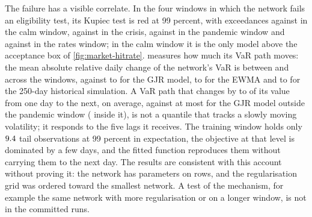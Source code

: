 The failure has a visible correlate. In the four windows in which the network fails an eligibility test, its Kupiec test is red at 99 percent, with \mkNnExcCalm{} exceedances against \mkExpCalm{} in the calm window, \mkNnExcGfc{} against \mkExpGfc{} in the crisis, \mkNnExcCovid{}
against \mkExpCovid{} in the pandemic window and \mkNnExcRates{} against \mkExpRates{} in the rates window; in the calm window it is the only model above the acceptance box of \cref{fig:market-hitrate}.  measures how much its VaR path moves: the mean absolute relative daily change of the network's VaR is between
\mkRoughMinNn{} and \mkRoughMaxNn{} across the windows, against \mkRoughMinGjr{} to \mkRoughMaxGjr{} for the GJR model, \mkRoughMinEwma{} to \mkRoughMaxEwma{} for the EWMA and \mkRoughMinHs{} to \mkRoughMaxHs{} for the 250-day historical simulation. A VaR path that changes by
\mkRoughMinNn{} to \mkRoughMaxNn{} of its value from one day to the next, on average, against at most \mkRoughMaxGjrOut{} for the GJR model outside the pandemic window (\mkGjrRoughACovid{} inside it), is not a quantile that tracks a slowly moving volatility; it responds to the five lags it receives. The training window holds only $9.4{}$ tail observations at 99 percent in expectation, the objective at that level is dominated by a few days, and the fitted
function reproduces them without carrying them to the next day. The results are consistent with this account without proving it: the network has \mkNnParams{} parameters on \mkNnTrainRows{} rows, and the regularisation grid was ordered toward the smallest network. A
test of the mechanism, for example the same network with more regularisation or on a longer window, is not in the committed runs.



